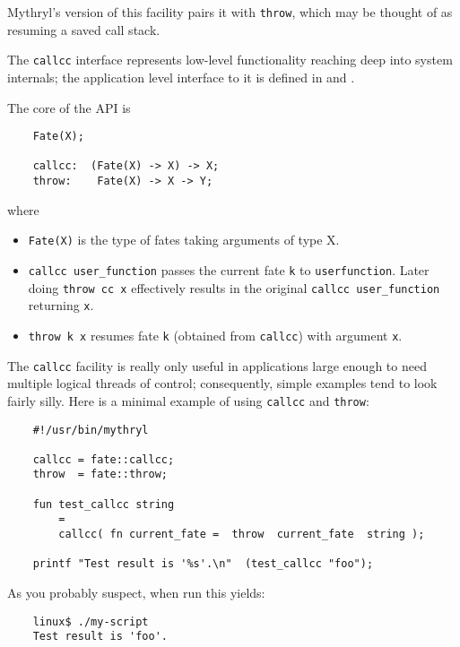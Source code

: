 Mythryl's version of this facility pairs it with 
{\tt throw}, which may be thought of as resuming a saved call stack.

The {\tt callcc} interface represents low-level functionality 
reaching deep into system internals;  the application level 
interface to it is defined in  
and .

The core of the API is

\begin{verbatim}
    Fate(X);

    callcc:  (Fate(X) -> X) -> X;
    throw:    Fate(X) -> X -> Y;
\end{verbatim}

where

\begin{itemize}
\item {\tt Fate(X)} is the type of fates taking arguments of type X.
\item {\tt callcc user\_function} passes the current fate {\tt k} to {\tt userfunction}.
      Later doing {\tt throw cc x} effectively results in the original 
      {\tt callcc user\_function} returning {\tt x}.
\item {\tt throw k x} resumes fate {\tt k} (obtained from {\tt callcc}) with argument {\tt x}.
\end{itemize}

The {\tt callcc} facility is really only useful in applications large enough 
to need multiple logical threads of control;  consequently, simple examples 
tend to look fairly silly.  Here is a minimal example of using {\tt callcc} and {\tt throw}:

\begin{verbatim}
    #!/usr/bin/mythryl

    callcc = fate::callcc;
    throw  = fate::throw;

    fun test_callcc string
        =
        callcc( fn current_fate =  throw  current_fate  string );

    printf "Test result is '%s'.\n"  (test_callcc "foo");
\end{verbatim}

As you probably suspect, when run this yields:

\begin{verbatim}
    linux$ ./my-script
    Test result is 'foo'.
\end{verbatim}

